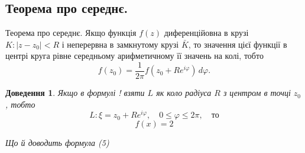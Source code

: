\documentclass[12pt,fleqn]{article}
\theoremstyle{theorem}
\theoremstyle{proof}
\newtheorem*{dov}{Доведення}
\numberwithin{figure}{section}
\numberwithin{equation}{section}
\begin{document}
\subsection{Теорема про середнє.}
Теорема про середнє. Якщо функція $f(z)$ диференційовна в крузі $K:|z-z_0|<R$ і неперервна в замкнутому крузі $\bar{K}$, то значення цієї функції в центрі круга рівне середньому арифметичному її значень на колі, тобто
\begin{equation}\label{xy}
f(z_0)=\frac{1}{2\pi}f(z_0+Re^{i\varphi})\,d\varphi.
\end{equation}

\begin{dov}
Якщо в формулі ! взяти $L$ як коло радіуса $R$ з центром в точці $z_0$, тобто
\[ L: \xi=z_0+Re^{i\varphi},\quad 0\leq\varphi\leq2\pi,\quad \text{то} \]
\[ f(x)=2 \]

Що й доводить формула (5)
\end{dov}
\end{document}
